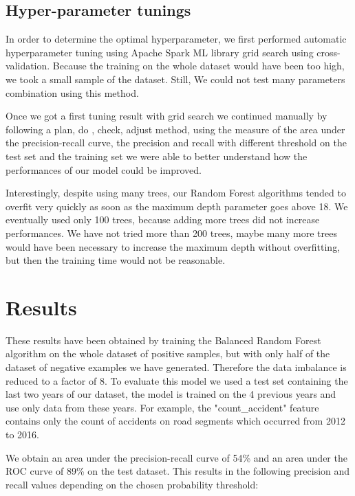 \documentclass[conference]{IEEEtran}
\begin{document}
\subsection{Hyper-parameter tunings}
In order to determine the optimal hyperparameter, we first performed automatic hyperparameter tuning using Apache Spark ML library grid search using cross-validation. Because the training on the whole dataset would have been too high, we took a small sample of the dataset. Still, We could not test many parameters combination using this method.

Once we got a first tuning result with grid search we continued manually by following a plan, do , check, adjust method, using the measure of the area under the precision-recall curve, the precision and recall with different threshold on the test set and the training set we were able to better understand how the performances of our model could be improved.

Interestingly, despite using many trees, our Random Forest algorithms tended to overfit very quickly as soon as the maximum depth parameter goes above 18. We eventually used only 100 trees, because adding more trees did not increase performances. We have not tried more than 200 trees, maybe many more trees would have been necessary to increase the maximum depth without overfitting, but then the training time would not be reasonable.

\section{Results}
These results have been obtained by training the Balanced Random Forest algorithm on the whole dataset of positive samples, but with only half of the dataset of negative examples we have generated. Therefore the data imbalance is reduced to a factor of 8. To evaluate this model we used a test set containing the last two years of our dataset, the model is trained on the 4 previous years and use only data from these years. For example, the "count\_accident" feature contains only the count of accidents on road segments which occurred from 2012 to 2016.

We obtain an area under the precision-recall curve of 54\% and an area under the ROC curve of 89\% on the test dataset.
This results in the following precision and recall values depending on the chosen probability threshold:
\end{document}
